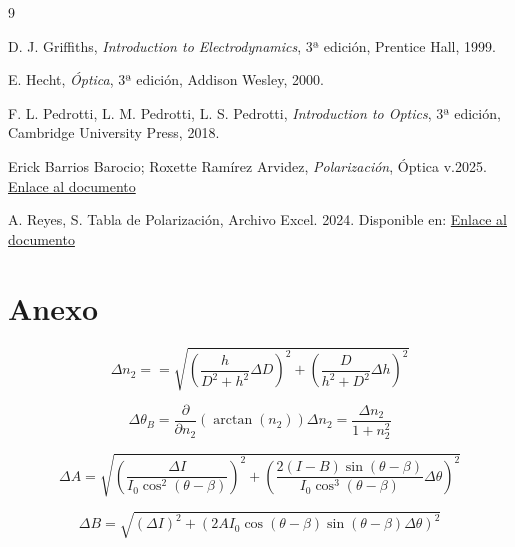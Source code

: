 \documentclass[article,12pt]{elsarticle}
\begin{document}
\begin{thebibliography}{9}

D. J. Griffiths, \textit{Introduction to Electrodynamics}, 3ª edición, Prentice Hall, 1999.

E. Hecht, \textit{Óptica}, 3ª edición, Addison Wesley, 2000.

F. L. Pedrotti, L. M. Pedrotti, L. S. Pedrotti, \textit{Introduction to Optics}, 3ª edición, Cambridge University Press, 2018.

Erick Barrios Barocio; Roxette Ramírez Arvidez, \textit{Polarización}, Óptica v.2025. \href{https://tsikbal.github.io/P%C3%A1ginas/%C3%81reas/F%C3%ADsica/%C3%93ptica/Optica_Fisica/Polarizaci%C3%B3n.html}{Enlace al documento}

 A. Reyes, S. Tabla de Polarización, Archivo Excel. 2024. Disponible en: \href{https://docs.google.com/spreadsheets/d/1_yYCZ7q34UFFrDisqF6pmfBwCw3KAzEm/edit?usp=sharing&ouid=112625838925660900694&rtpof=true&sd=true}{Enlace al documento}
\end{thebibliography}


\section*{Anexo}

\begin{mdframed}
\begin{equation}
\Delta n_2 = 
= \sqrt{
    \left( \frac{h}{D^2 + h^2} \Delta D \right)^2 
    + \left( \frac{D}{h^2 + D^2} \Delta h \right)^2}
\end{equation}
\end{mdframed}

\begin{mdframed}
\begin{equation}
\Delta \theta_B = \frac{\partial}{\partial n_2} \left( \arctan(n_2) \right) \Delta n_2 = \frac{\Delta n_2}{1 + n_2^2}
\end{equation}
\end{mdframed}

\begin{mdframed}
\begin{equation}
\Delta A = \sqrt{
    \left( \frac{\Delta I}{I_0 \cos^2(\theta - \beta)} \right)^2 
    + \left( \frac{2(I - B) \sin(\theta - \beta)}{I_0 \cos^3(\theta - \beta)} \Delta \theta \right)^2
}
\end{equation}
\end{mdframed}

\begin{mdframed}
\begin{equation}
\Delta B = \sqrt{
    \left( \Delta I \right)^2 
    + \left( 2 A I_0 \cos(\theta - \beta) \sin(\theta - \beta) \Delta \theta \right)^2
}
\end{equation}
\end{mdframed}
\end{document}
